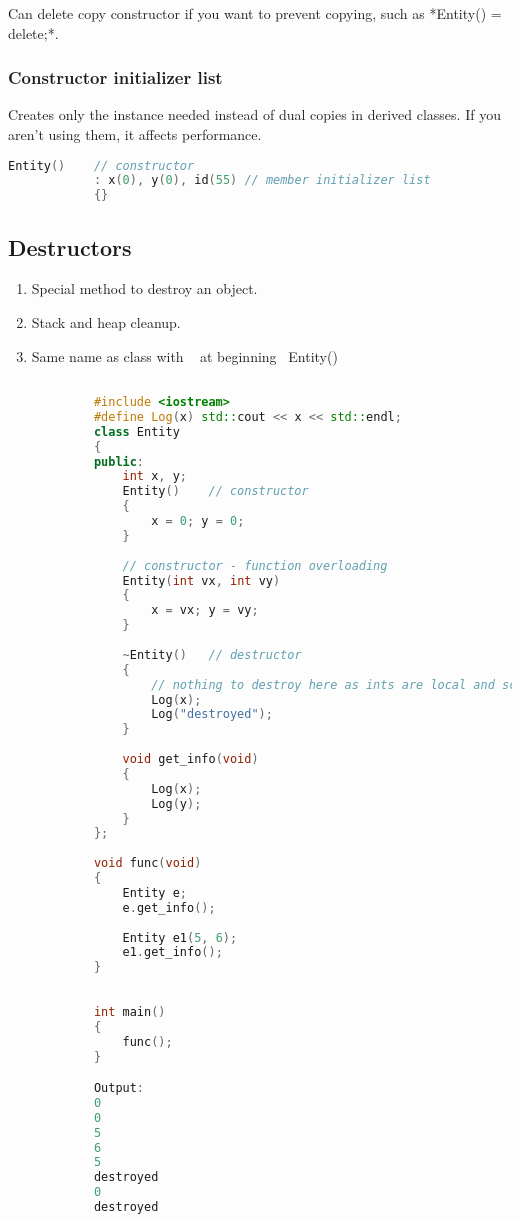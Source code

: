 \documentclass{article}
\begin{document}
        Can delete copy constructor if you want to prevent copying, such as *Entity() = delete;*.
    
    \subsubsection{Constructor initializer list}
        Creates only the instance needed instead of dual copies in derived classes. If you aren't using them, it affects performance.
        \begin{lstlisting}[language=C++, caption=Member initializer list example]
            Entity()	// constructor
    		: x(0), y(0), id(55) // member initializer list
    	    {}
        \end{lstlisting}
    
    
    \subsection{Destructors}
        \begin{enumerate}
        \item Special method to destroy an object.
        \item Stack and heap cleanup.
        \item Same name as class with ~ at beginning ~Entity() {}
        \end{enumerate}
    
        \begin{lstlisting}[language=C++, caption=Constructor \& Destructor example with overloading]
        
            #include <iostream>
            #define Log(x) std::cout << x << std::endl;
            class Entity
            {
            public:
            	int x, y;
            	Entity()	// constructor
            	{
            		x = 0; y = 0;
            	}
            
                // constructor - function overloading
            	Entity(int vx, int vy)	
            	{
            		x = vx; y = vy;
            	}
            
            	~Entity()	// destructor
            	{
            		// nothing to destroy here as ints are local and scope is limited.
            		Log(x);
            		Log("destroyed");
            	}
            
            	void get_info(void)
            	{
            		Log(x);
            		Log(y);
            	}
            };
            
            void func(void)
            {
            	Entity e;
            	e.get_info();
            
            	Entity e1(5, 6);
            	e1.get_info();
            }
            
            
            int main()
            {
            	func();
            }

            Output:
            0
            0
            5
            6
            5
            destroyed
            0
            destroyed
        \end{lstlisting}
        
\end{document}

